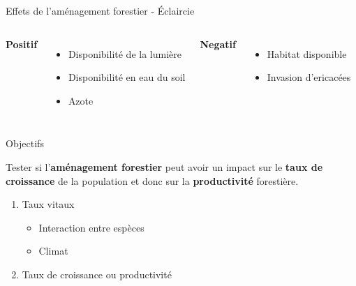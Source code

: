 \documentclass[11pt, compress, aspectratio=1610]{beamer}
\providecommand{\tightlist}{%
  \setlength{\itemsep}{0pt}\setlength{\parskip}{0pt}}
\newcommand{\begincols}{\begin{columns}}
\newcommand{\stopcols}{\end{columns}}
\begin{document}

\begin{frame}{Effets de l’aménagement forestier - Éclaircie}
\protect\hypertarget{effets-de-lamuxe9nagement-forestier---uxe9claircie}{}

\begincols
\hspace*{20mm}

\textbf{Positif}

\begin{itemize}
    \item
      Disponibilité de la lumière
    \item
      Disponibilité en eau du soil
    \item
      Azote
  \end{itemize}
\hfill{}
  \vspace*{-15mm}

\textbf{Negatif}

\begin{itemize}
    \item
      Habitat disponible
    \item
      Invasion d'ericacées
  \end{itemize}
\stopcols

\end{frame}

\begin{frame}{Objectifs}
\protect\hypertarget{objectifs-3}{}

\centering

Tester si l’\textbf{aménagement forestier} peut avoir un impact sur le
\textbf{taux de croissance} de la population et donc sur la
\textbf{productivité} forestière.

\begin{enumerate}
[1.]
\tightlist
\item
  Taux vitaux

  \begin{itemize}
  \tightlist
  \item
    Interaction entre espèces
  \item
    Climat
  \end{itemize}
\item
  Taux de croissance ou productivité
\end{enumerate}

\end{frame}
\end{document}
